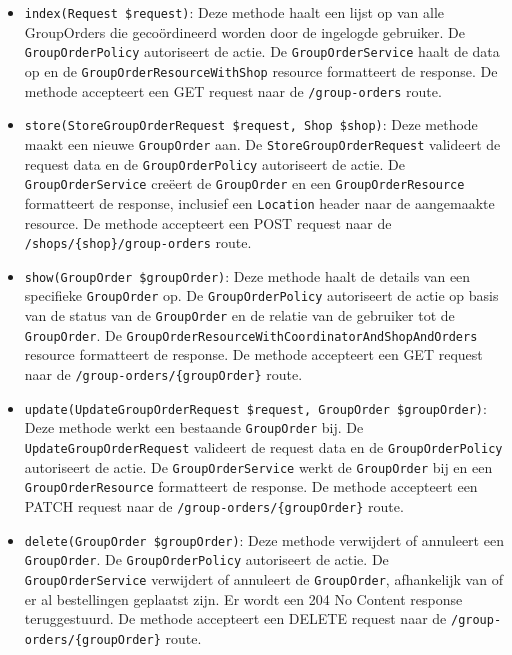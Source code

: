 \begin{itemize}
  \item \texttt{index(Request \$request)}: Deze methode haalt een lijst op van alle GroupOrders die gecoördineerd worden door de ingelogde gebruiker. De \texttt{GroupOrderPolicy} autoriseert de actie. De \texttt{GroupOrderService} haalt de data op en de \texttt{GroupOrderResourceWithShop} resource formatteert de response. De methode accepteert een GET request naar de \texttt{/group-orders} route.
  \item \texttt{store(StoreGroupOrderRequest \$request, Shop \$shop)}: Deze methode maakt een nieuwe \texttt{GroupOrder} aan. De \texttt{StoreGroupOrderRequest} valideert de request data en de \texttt{GroupOrderPolicy} autoriseert de actie. De \texttt{GroupOrderService} creëert de \texttt{GroupOrder} en een \texttt{GroupOrderResource} formatteert de response, inclusief een \texttt{Location} header naar de aangemaakte resource. De methode accepteert een POST request naar de \texttt{/shops/\{shop\}/group-orders} route.
  \item \texttt{show(GroupOrder \$groupOrder)}: Deze methode haalt de details van een specifieke \texttt{GroupOrder} op. De \texttt{GroupOrderPolicy} autoriseert de actie op basis van de status van de \texttt{GroupOrder} en de relatie van de gebruiker tot de \texttt{GroupOrder}. De \texttt{GroupOrderResourceWithCoordinatorAndShopAndOrders} resource formatteert de response. De methode accepteert een GET request naar de \texttt{/group-orders/\{groupOrder\}} route.
  \item \texttt{update(UpdateGroupOrderRequest \$request, GroupOrder \$groupOrder)}: Deze methode werkt een bestaande \texttt{GroupOrder} bij. De \texttt{UpdateGroupOrderRequest} valideert de request data en de \texttt{GroupOrderPolicy} autoriseert de actie. De \texttt{GroupOrderService} werkt de \texttt{GroupOrder} bij en een \texttt{GroupOrderResource} formatteert de response. De methode accepteert een PATCH request naar de \texttt{/group-orders/\{groupOrder\}} route.
  \item \texttt{delete(GroupOrder \$groupOrder)}: Deze methode verwijdert of annuleert een \texttt{GroupOrder}. De \texttt{GroupOrderPolicy} autoriseert de actie. De \texttt{GroupOrderService} verwijdert of annuleert de \texttt{GroupOrder}, afhankelijk van of er al bestellingen geplaatst zijn. Er wordt een 204 No Content response teruggestuurd. De methode accepteert een DELETE request naar de \texttt{/group-orders/\{groupOrder\}} route.
\end{itemize}


